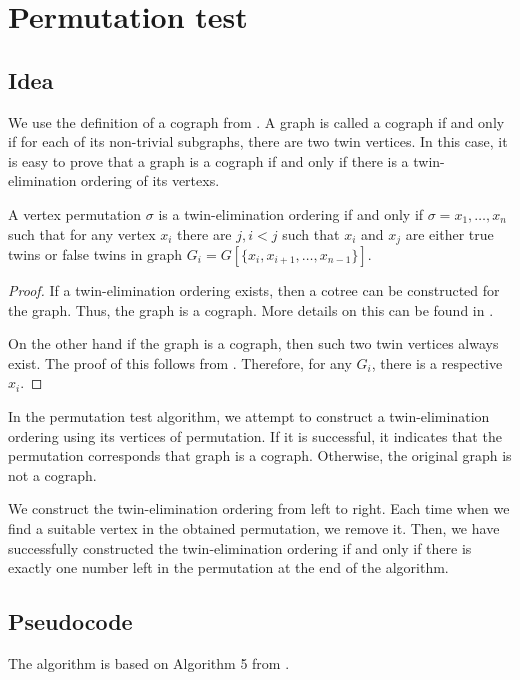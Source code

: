 \section{Permutation test}

\subsection{Idea}
We use the definition of a cograph from . A graph is called a cograph if and only if for each of its non-trivial subgraphs, there are two twin vertices. In this case, it is easy to prove that a graph is a cograph if and only if there is a twin-elimination ordering of its vertexs.
\begin{definition}
   A vertex permutation $\sigma$ is a twin-elimination ordering if and only if $\sigma=x_1,\dots,x_n$ such that for any vertex $x_i$ there are $j,i<j$ such that $x_i$ and $x_j$ are either true twins or false twins in graph $G_i=G[ \{x_i,x_{i+1},\dots,x_{n-1}\} ]$.
\end{definition}
\begin{proof}
If a twin-elimination ordering exists, then a cotree can be constructed for the graph. Thus, the graph is a cograph. More details on this can be found in .

On the other hand if the graph is a cograph, then such two twin vertices 
always exist. The proof of this follows from . Therefore, for any $G_i$, there is a respective $x_i$.
\end{proof}


In the permutation test algorithm, we attempt to construct a twin-elimination ordering using its vertices of permutation. If it is successful, it indicates that the permutation corresponds that graph is a cograph. Otherwise, the original graph is not a cograph.


 We construct the twin-elimination ordering from left to right. Each time when we find a suitable vertex in the obtained permutation, we remove it. Then, we have successfully constructed the twin-elimination ordering if and only if there is exactly one number left in the permutation at the end of the algorithm.
\subsection{Pseudocode}

The algorithm is based on Algorithm 5 from \cite{HABIB2005183}.

